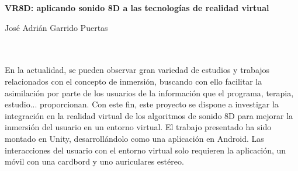 \begin{center}
{\large\bfseries VR8D: aplicando sonido 8D a las tecnologías de realidad virtual}\\
\end{center}

\begin{center}
José Adrián Garrido Puertas\\
\end{center}

\begin{flushleft}
	\\
	
	\vspace{0.7cm}
	\\
	En la actualidad, se pueden observar gran variedad de estudios y trabajos relacionados con el concepto de inmersión, buscando con ello facilitar la asimilación por parte de los usuarios de la información que el programa, terapia, estudio... proporcionan.   
	Con este fin, este proyecto se dispone a investigar la integración en la realidad virtual de los algoritmos de sonido 8D para mejorar la inmersión del usuario en un entorno virtual.
	El trabajo presentado ha sido montado en Unity, desarrollándolo como una aplicación en Android.
	Las interacciones del usuario con el entorno virtual solo requieren la aplicación, un móvil con una cardbord y uno auriculares estéreo.
\end{flushleft}

\newpage 



